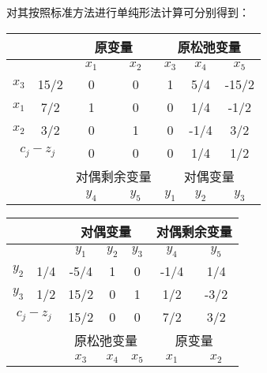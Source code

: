 \documentclass[UTF8, 6pt]{ctexart}
\newcommand{\mcompress}{\vspace{-10 px}}
\begin{document}
对其按照标准方法进行单纯形法计算可分别得到：

\mcompress
\begin{table}[htb]
	\centering
	\footnotesize
	\begin{tabular}{|cc|cc|ccc|}
		\hline
		      &                         &  \multicolumn{2}{c}{原变量}   & \multicolumn{3}{|c|}{原松弛变量} \\ \hline
		      &                         & $x_1$ &       $x_2$        & $x_3$ & $x_4$ &    $x_5$    \\ \hline
		$x_3$ &          15/2           &   0   &         0          &   1   &  5/4  &    -15/2    \\
		$x_1$ &           7/2           &   1   &         0          &   0   &  1/4  &    -1/2     \\
		$x_2$ &           3/2           &   0   &         1          &   0   & -1/4  &     3/2     \\ \hline
		\multicolumn{2}{|c|}{$c_j-z_j$} &   0   &         0          &   0   &  1/4  &     1/2     \\ \hline
		      &                         & \multicolumn{2}{c}{对偶剩余变量} & \multicolumn{3}{|c|}{对偶变量}  \\ \hline
		      &                         & $y_4$ &       $y_5$        & $y_1$ & $y_2$ &    $y_3$ \\ \hline
	\end{tabular}
\end{table}
\mcompress\mcompress
\begin{table}[htb]
	\footnotesize
	\centering
	\begin{tabular}{|cc|ccc|cc|}
		\hline
		      &                       & \multicolumn{3}{c}{对偶变量}  & \multicolumn{2}{|c|}{对偶剩余变量} \\\hline
		      &                       & $y_1$ & $y_2$ &   $y_3$   & $y_4$ &       $y_5$        \\\hline
		$y_2$ &          1/4          & -5/4  &   1   &     0     & -1/4  &        1/4         \\
		$y_3$ &          1/2          & 15/2  &   0   &     1     &  1/2  &        -3/2        \\\hline
		\multicolumn{2}{|c|}{$c_j-z_j$} & 15/2  &   0   &     0     &  7/2  &        3/2         \\\hline
		      &                       & \multicolumn{3}{c}{原松弛变量} &  \multicolumn{2}{|c|}{原变量}   \\ \hline
		      &                       & $x_3$ & $x_4$ &   $x_5$   & $x_1$ &       $x_2$\\ \hline
	\end{tabular}
\end{table}
\end{document}
